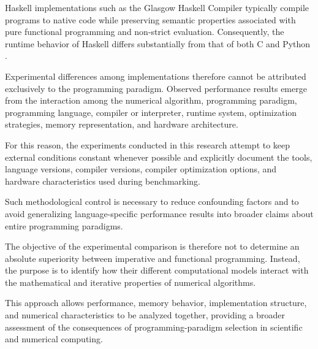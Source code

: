 Haskell implementations such as the Glasgow Haskell Compiler typically compile
programs to native code while preserving semantic properties associated with
pure functional programming and non-strict evaluation. Consequently, the
runtime behavior of Haskell differs substantially from that of both C and
Python
\cite{marlow2010haskell}.

Experimental differences among implementations therefore cannot be attributed
exclusively to the programming paradigm. Observed performance results emerge
from the interaction among the numerical algorithm, programming paradigm,
programming language, compiler or interpreter, runtime system, optimization
strategies, memory representation, and hardware architecture.

For this reason, the experiments conducted in this research attempt to keep
external conditions constant whenever possible and explicitly document the
tools, language versions, compiler versions, compiler optimization options,
and hardware characteristics used during benchmarking.

Such methodological control is necessary to reduce confounding factors and to
avoid generalizing language-specific performance results into broader claims
about entire programming paradigms.

The objective of the experimental comparison is therefore not to determine an
absolute superiority between imperative and functional programming. Instead,
the purpose is to identify how their different computational models interact
with the mathematical and iterative properties of numerical algorithms.

This approach allows performance, memory behavior, implementation structure,
and numerical characteristics to be analyzed together, providing a broader
assessment of the consequences of programming-paradigm selection in scientific
and numerical computing.
